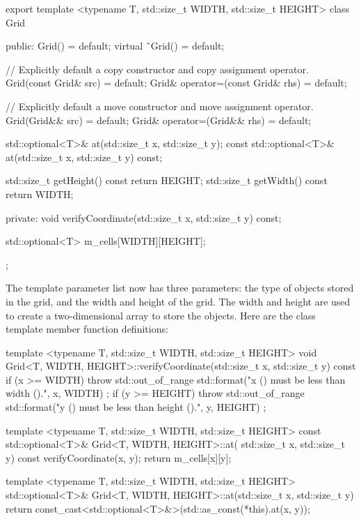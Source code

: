 \begin{cpp}
export template <typename T, std::size_t WIDTH, std::size_t HEIGHT>
class Grid
{
    public:
        Grid() = default;
        virtual ˜Grid() = default;

        // Explicitly default a copy constructor and copy assignment operator.
        Grid(const Grid& src) = default;
        Grid& operator=(const Grid& rhs) = default;

        // Explicitly default a move constructor and move assignment operator.
        Grid(Grid&& src) = default;
        Grid& operator=(Grid&& rhs) = default;

        std::optional<T>& at(std::size_t x, std::size_t y);
        const std::optional<T>& at(std::size_t x, std::size_t y) const;

        std::size_t getHeight() const { return HEIGHT; }
        std::size_t getWidth() const { return WIDTH; }

    private:
        void verifyCoordinate(std::size_t x, std::size_t y) const;

        std::optional<T> m_cells[WIDTH][HEIGHT];
};
\end{cpp}

The template parameter list now has three parameters: the type of objects stored in the grid, and the width and height of the grid. The width and height are used to create a two-dimensional array to store the objects. Here are the class template member function definitions:

\begin{cpp}
template <typename T, std::size_t WIDTH, std::size_t HEIGHT>
void Grid<T, WIDTH, HEIGHT>::verifyCoordinate(std::size_t x, std::size_t y) const
{
    if (x >= WIDTH) {
        throw std::out_of_range {
            std::format("x ({}) must be less than width ({}).", x, WIDTH) };
    }
    if (y >= HEIGHT) {
        throw std::out_of_range {
            std::format("y ({}) must be less than height ({}).", y, HEIGHT) };
    }
}

template <typename T, std::size_t WIDTH, std::size_t HEIGHT>
const std::optional<T>& Grid<T, WIDTH, HEIGHT>::at(
    std::size_t x, std::size_t y) const
{
    verifyCoordinate(x, y);
    return m_cells[x][y];
}

template <typename T, std::size_t WIDTH, std::size_t HEIGHT>
std::optional<T>& Grid<T, WIDTH, HEIGHT>::at(std::size_t x, std::size_t y)
{
    return const_cast<std::optional<T>&>(std::as_const(*this).at(x, y));
}
\end{cpp}

